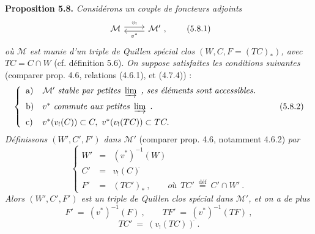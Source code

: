 \documentclass[11pt]{article}
\newcommand{\msp}[1]{\marginpar{\footnotesize [#1]}}
\newcommand{\cl}{^{\tilde{}}}%
\newcommand{\defeq}{\overset{\text{déf}}{=}}
\begin{document}
\msp{page 91}
\textbf{Proposition 5.8.} \textit{Considérons un couple de foncteurs adjoints}
\[
\begin{tikzcd}
\mathcal{M} \arrow[r, shift left, "v_!"] & \mathcal{M}' \arrow[l, shift left, "v^*"] \ ,
\end{tikzcd}
\tag*{(5.8.1)}
\]
\textit{où $\mathcal{M}$ est munie d'un triple de Quillen spécial clos $(W, C, F = (TC)_*)$, avec $TC = C \cap W$} (cf. définition 5.6). \textit{On suppose satisfaites les conditions suivantes} (comparer prop. 4.6, relations (4.6.1), et (4.7.4)) :
\[
\left\{
\begin{array}{ll}
\text{a)} & \mathcal{M}' \ \textit{stable par petites}\ \varinjlim\ \textit{, ses éléments sont accessibles.}\\[1.5ex]
\text{b)} & v^* \ \textit{commute aux petites}\ \varinjlim\ .\\[1.5ex]
\text{c)} & v^*(v_!(C)) \subset C,\ v^*(v_!(TC)) \subset TC.
\end{array}
\right.
\tag*{(5.8.2)}
\]
\textit{Définissons $(W', C', F')$ dans $\mathcal{M}'$} (comparer prop. 4.6, notamment 4.6.2) \textit{par}
\[
\left\{
\begin{array}{lcl}
W' & = & (v^*)^{-1}(W)\\[1ex]
C' & = & v_!(C)\cl\\[1ex]
F' & = & (TC')_*\ , \qquad \textit{où}\ \ TC' \ \defeq \ C' \cap W'\ .
\end{array}
\right.
\tag*{(5.8.3)}
\]
\textit{Alors $(W', C', F')$ est un triple de Quillen clos spécial dans $\mathcal{M}'$, et on a de plus}
\[
F' \ = \ (v^*)^{-1}(F)\ , \qquad TF' \ = \ (v^*)^{-1}(TF)\ ,
\tag*{(5.8.4)}
\]
\[
TC' \ = \ (v_!(TC))\cl\ .
\tag*{(5.8.5)}
\]
\end{document}
